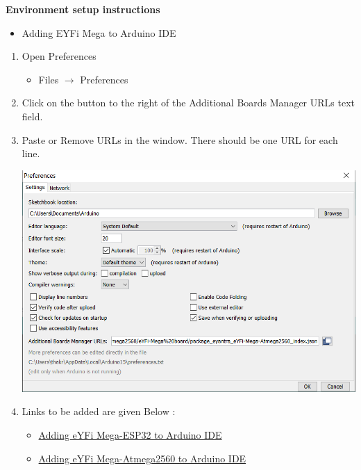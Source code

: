 \documentclass[12pt,a4paper,oneside]{book}
\begin{document}
            \begin{huge}
                \textbf{Environment setup instructions}
            \end{huge}
            \begin{itemize}
                \item Adding EYFi Mega to Arduino IDE
            \end{itemize}
  
            \begin{enumerate}
                \item  Open Preferences
                    \begin{itemize}
                        \item Files $\to$ Preferences
                    \end{itemize}
                \item Click on the button to the right of the Additional Boards Manager URLs text field.
                \item Paste or Remove URLs in the window. There should be one URL for each line.
                \begin{center}
    				\includegraphics[scale=0.85]{Preference}
    			\end{center} 
    			\item Links to be added are given Below :
                    \begin{itemize}
                        \item \href{https://raw.githubusercontent.com/eYSIP-2020/eysip2020-36-eYFi-Mega-ArduinoIDE/master/e-Yantra-ESP32/eYFi-Mega%20board/package_eyantra_eYFi-Mega-ESP32_index.json}{Adding eYFi Mega-ESP32 to Arduino IDE}
                         \item \href{https://raw.githubusercontent.com/eYSIP-2020/eysip2020-36-eYFi-Mega-ArduinoIDE/master/e-Yantra-ATmega2560/eYFi-Mega%20board/package_eyantra_eYFi-Mega-Atmega2560_index.json, https://raw.githubusercontent.com/eYSIP-2020/eysip2020-36-eYFi-Mega-ArduinoIDE/master/e-Yantra-ATmega2560/eYFi-Mega%20board/package_eyantra_eYFi-Mega-Atmega2560_index.json}{Adding eYFi Mega-Atmega2560 to Arduino IDE}

\end{itemize}
\end{enumerate}
\end{document}

